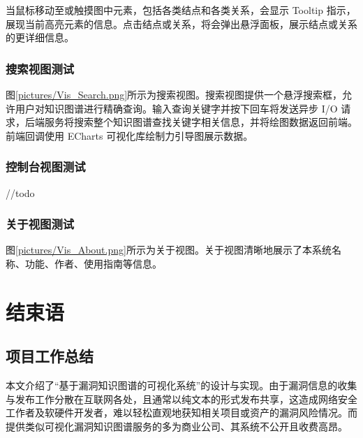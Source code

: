 \documentclass[a4paper,AutoFakeBold,oneside,12pt]{book}
\begin{document}
当鼠标移动至或触摸图中元素，包括各类结点和各类关系，会显示 Tooltip 指示，展现当前高亮元素的信息。点击结点或关系，将会弹出悬浮面板，展示结点或关系的更详细信息。


\subsection{搜索视图测试}

图\ref{pictures/Vis_Search.png}所示为搜索视图。搜索视图提供一个悬浮搜索框，允许用户对知识图谱进行精确查询。输入查询关键字并按下回车将发送异步 I/O 请求，后端服务将搜索整个知识图谱查找关键字相关信息，并将绘图数据返回前端。前端回调使用 ECharts 可视化库绘制力引导图展示数据。


\subsection{控制台视图测试}

//todo

\subsection{关于视图测试}

图\ref{pictures/Vis_About.png}所示为关于视图。关于视图清晰地展示了本系统名称、功能、作者、使用指南等信息。


\chapter{结束语}

\section{项目工作总结}

本文介绍了“基于漏洞知识图谱的可视化系统”的设计与实现。由于漏洞信息的收集与发布工作分散在互联网各处，且通常以纯文本的形式发布共享，这造成网络安全工作者及软硬件开发者，难以轻松直观地获知相关项目或资产的漏洞风险情况。而提供类似可视化漏洞知识图谱服务的多为商业公司、其系统不公开且收费高昂。
\end{document}
